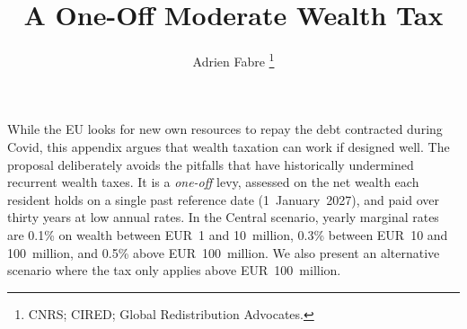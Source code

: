 \documentclass[../../main]{subfiles}
\begin{document}
\title{A One-Off Moderate Wealth Tax}
\author{Adrien Fabre \thanks{CNRS; CIRED; Global Redistribution Advocates.}}
\maketitle


While the EU looks for new own resources to repay the debt contracted during Covid, this appendix argues that %
wealth taxation can work if designed well. %
The proposal deliberately avoids the pitfalls that have historically undermined recurrent wealth taxes.  It is a \emph{one-off} levy, assessed on the net wealth each resident holds on a single past reference date (1~January~2027), and paid over thirty years at low annual rates. In the Central scenario, yearly marginal rates are 0.1\% on wealth between EUR~1 and 10~million, 0.3\% between EUR~10 and 100~million, and 0.5\% above EUR~100~million. We also present an alternative scenario where the tax only applies above EUR~100~million. 
\end{document}
